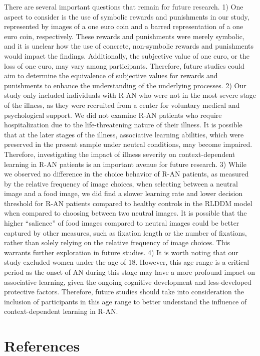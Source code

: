 \documentclass[
  man,floatsintext]{apa6}
\begin{document}
There are several important questions that remain for future research. 1) One aspect to consider is the use of symbolic rewards and punishments in our study, represented by images of a one euro coin and a barred representation of a one euro coin, respectively. These rewards and punishments were merely symbolic, and it is unclear how the use of concrete, non-symbolic rewards and punishments would impact the findings. Additionally, the subjective value of one euro, or the loss of one euro, may vary among participants. Therefore, future studies could aim to determine the equivalence of subjective values for rewards and punishments to enhance the understanding of the underlying processes. 2) Our study only included individuals with R-AN who were not in the most severe stage of the illness, as they were recruited from a center for voluntary medical and psychological support. We did not examine R-AN patients who require hospitalization due to the life-threatening nature of their illness. It is possible that at the later stages of the illness, associative learning abilities, which were preserved in the present sample under neutral conditions, may become impaired. Therefore, investigating the impact of illness severity on context-dependent learning in R-AN patients is an important avenue for future research. 3) While we observed no difference in the choice behavior of R-AN patients, as measured by the relative frequency of image choices, when selecting between a neutral image and a food image, we did find a slower learning rate and lower decision threshold for R-AN patients compared to healthy controls in the RLDDM model when compared to choosing between two neutral images. It is possible that the higher ``salience'' of food images compared to neutral images could be better captured by other measures, such as fixation length or the number of fixations, rather than solely relying on the relative frequency of image choices. This warrants further exploration in future studies. 4) It is worth noting that our study excluded women under the age of 18. However, this age range is a critical period as the onset of AN during this stage may have a more profound impact on associative learning, given the ongoing cognitive development and less-developed protective factors. Therefore, future studies should take into consideration the inclusion of participants in this age range to better understand the influence of context-dependent learning in R-AN.

\newpage

\hypertarget{references}{%
\section{References}\label{references}}
\end{document}
